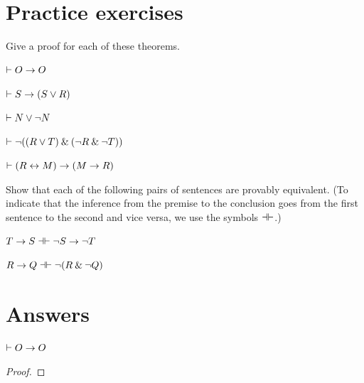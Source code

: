 
\newpage

\section{Practice exercises}
\setcounter{ProbPart}{0}

\begin{small}

\problempart
Give a proof for each of these theorems.
\begin{earg}
\item $\vdash O \rightarrow O$\smallskip
\item $\vdash S \rightarrow (S \vee R)$\smallskip
\item $\vdash N \vee {\neg} N$\smallskip
\item $\vdash {\neg}((R \vee T) \mathbin{\&} ({\neg} R  \mathbin{\&} {\neg} T))$\smallskip
\item $\vdash (R \leftrightarrow M) \rightarrow (M \rightarrow R)$\smallskip
\end{earg}


\problempart
Show that each of the following pairs of sentences are provably equivalent. (To indicate that the inference from the premise to the conclusion goes from the first sentence to the second and vice versa, we use the symbols $\dashv\vdash$.)
\begin{earg}
\item $T\rightarrow S \dashv\vdash {\neg} S \rightarrow {\neg} T$
\item $R \rightarrow Q \dashv\vdash {\neg}(R \mathbin{\&} {\neg} Q)$
\end{earg}




\section{Answers}
\setcounter{ProbPart}{0}

\problempart


\begin{earg}

\noindent\begin{minipage}{0.99\textwidth}
\item $\vdash O \rightarrow O$
\begin{proof}
\open
	 \as{}
\close
{}
\end{proof}
\bigskip
\end{minipage}


\end{earg}
\end{small}
